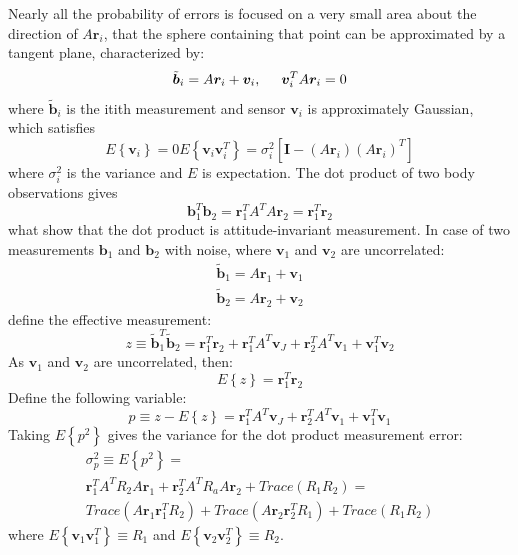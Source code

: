 \documentclass[12pt,a4paper,twoside]{article}
\begin{document}
Nearly all the probability of errors is focused on a very small area about the direction of $A\bm{r}_i$, that the sphere containing that point can be approximated by a tangent plane, characterized by:
\begin{equation}
\tilde{\bm{b}}_i = A\bm{r}_i + \bm{v}_i, \hspace{0.5cm} \bm{v}_i^TA\bm{r}_i = 0
\end{equation}
where $\tilde{\bm{b}}_i$ is the it{i}th measurement and sensor $\bm{v}_i$ is approximately Gaussian, which satisfies
\begin{subequations}
\begin{equation}
E\left\{\bm{v}_i\right\} = 0
\end{equation}
\begin{equation}
E\left\{\bm{v}_i\bm{v}_i^T\right\} = \sigma_i^2 [\bm{I} - (A\bm{r}_i)(A\bm{r}_i)^T]
\end{equation}
\end{subequations}
where $\sigma_i^2$ is the variance and $E$ is expectation.
The dot product of two body observations gives
\begin{equation}
\bm{b}_1^T\bm{b}_2 = \bm{r}_1^TA^TA\bm{r}_2 = \bm{r}_1^T\bm{r}_2
\end{equation}
what show that the dot product is attitude-invariant measurement.
In case of two measurements $\bm{b}_1$ and $\bm{b}_2$ with noise, where $\bm{v}_1$ and $\bm{v}_2$ are uncorrelated:
\begin{subequations}
\begin{align*}
\tilde{\bm{b}}_1 = A\bm{r}_1 + \bm{v}_1\\
\tilde{\bm{b}}_2 = A\bm{r}_2 + \bm{v}_2
\end{align*}
\end{subequations}
define the effective measurement:
\begin{equation}
z \equiv \tilde{\bm{b}}_1^T\tilde{\bm{b}}_2 = \bm{r}_1^T\bm{r}_2 + \bm{r}_1^TA^T\bm{v}_J + \bm{r}_2^TA^T\bm{v}_1 + \bm{v}_1^T\bm{v}_2
\end{equation}
As $\bm{v}_1$ and $\bm{v}_2$ are uncorrelated, then:
\begin{equation}
E\left\{z\right\} = \bm{r}_1^T\bm{r}_2
\end{equation}
Define the following variable:
\begin{equation}
p \equiv z - E\left\{z\right\} = \bm{r}_1^TA^T\bm{v}_J + \bm{r}_2^TA^T\bm{v}_1 + \bm{v}_1^T\bm{v}_1
\end{equation}
Taking $E\left\{p^2\right\}$ gives the variance for the dot product measurement error:
\begin{equation}
\begin{split}
\sigma_p^2 \equiv E\left\{p^2\right\} = \\
\bm{r}_1^TA^TR_2A\bm{r}_1 + \bm{r}_2^TA^TR_aA\bm{r}_2 + Trace(R_1R_2) = \\
Trace(A\bm{r}_1\bm{r}_1^TR_2) + Trace(A\bm{r}_2\bm{r}_2^TR_1) + Trace(R_1R_2)
\end{split}
\end{equation}
where $E\left\{\bm{v}_1\bm{v}_1^T\right\}\equiv R_1$ and $E\left\{\bm{v}_2\bm{v}_2^T\right\}\equiv R_2$.
\end{document}
